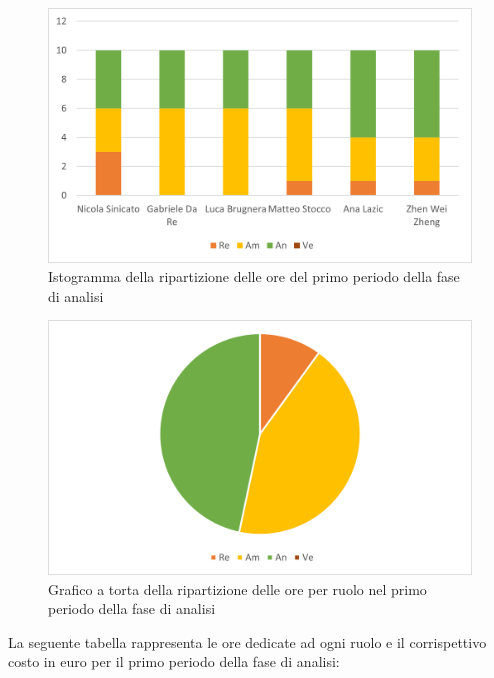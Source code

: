 \begin{figure}[H]
    \centering
    \includegraphics[scale=0.6]{img/grafi preventivo/istogrammi/analisi/periodo1.png}
    \caption{Istogramma della ripartizione delle ore del primo periodo della fase di analisi}
\end{figure}
\begin{figure}[H]
    \centering
    \includegraphics[scale=0.6]{img/grafi preventivo/torta/analisi/periodo1.png}
    \caption{Grafico a torta della ripartizione delle ore per ruolo nel primo periodo della fase di analisi}
\end{figure}

La seguente tabella rappresenta le ore dedicate ad ogni ruolo e il corrispettivo costo in euro per il primo periodo della fase di analisi:

